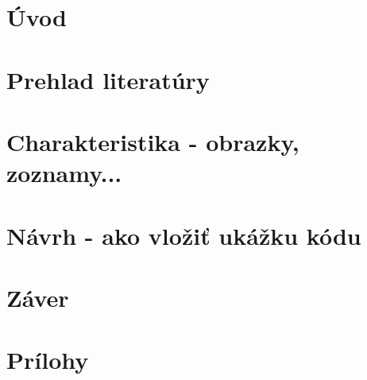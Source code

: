 


\tableofcontents
\newpage

\chapter{Úvod}


\chapter{Prehlad literatúry}

\chapter{Charakteristika - obrazky, zoznamy...}


\chapter{Návrh - ako vložiť ukážku kódu}


\chapter{Záver}

\printbibliography
{}  %


\chapter*{Prílohy}   %

